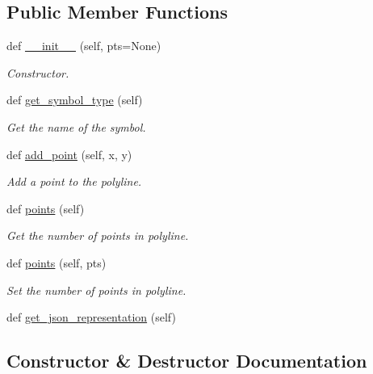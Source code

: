 \subsection*{Public Member Functions}
\begin{DoxyCompactItemize}
\item 
def \hyperlink{classbridges_1_1polyline_1_1_polyline_a536cf599bc221283c8e8d6df2324f23e}{\+\_\+\+\_\+init\+\_\+\+\_\+} (self, pts=None)
\begin{DoxyCompactList}\small\item\em Constructor. \end{DoxyCompactList}\item 
def \hyperlink{classbridges_1_1polyline_1_1_polyline_aae397f351a52883654e1edbb1069369e}{get\+\_\+symbol\+\_\+type} (self)
\begin{DoxyCompactList}\small\item\em Get the name of the symbol. \end{DoxyCompactList}\item 
def \hyperlink{classbridges_1_1polyline_1_1_polyline_a0afbd2327d8dcba63809a6be07704753}{add\+\_\+point} (self, x, y)
\begin{DoxyCompactList}\small\item\em Add a point to the polyline. \end{DoxyCompactList}\item 
def \hyperlink{classbridges_1_1polyline_1_1_polyline_ad1671a5857ad9e4010b7783b472c83fa}{points} (self)
\begin{DoxyCompactList}\small\item\em Get the number of points in polyline. \end{DoxyCompactList}\item 
def \hyperlink{classbridges_1_1polyline_1_1_polyline_ad543fcb38cb561b71d2ae2a9a88d9888}{points} (self, pts)
\begin{DoxyCompactList}\small\item\em Set the number of points in polyline. \end{DoxyCompactList}\item 
def \hyperlink{classbridges_1_1polyline_1_1_polyline_a7f99e9e20c90068713b54ad64df3f193}{get\+\_\+json\+\_\+representation} (self)
\end{DoxyCompactItemize}


\subsection{Constructor \& Destructor Documentation}
\mbox{\label{classbridges_1_1polyline_1_1_polyline_a536cf599bc221283c8e8d6df2324f23e}} 
